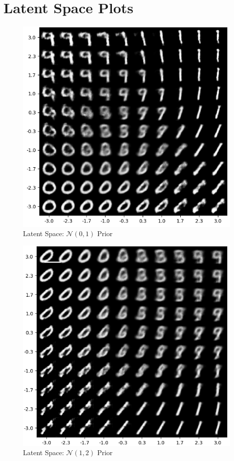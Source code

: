 \documentclass[12pt]{article}
\begin{document}
\section{Latent Space Plots}
\label{latent_spaces}
\begin{figure}[h]
\centering
\includegraphics[width=1\linewidth]{report_images/normal_vae/latent_space.png}
\caption{\label{fig:latent_normal}Latent Space: $\mathcal{N}(0,1)$ Prior}
\end{figure}

\begin{figure}[h]
\centering
\includegraphics[width=1\linewidth]{report_images/gaussian_vae/latent_space.png}
\caption{\label{fig:latent_guassian}Latent Space: $\mathcal{N}(1,2)$ Prior}
\end{figure}
\end{document}
